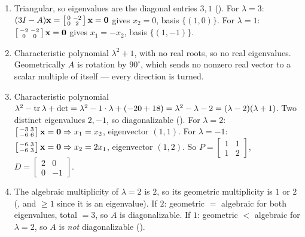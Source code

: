 \begin{enumerate}[label=\textbf{6.\arabic*},leftmargin=2.6em,itemsep=8pt]

\item Triangular, so eigenvalues are the diagonal entries $3,1$ (). For $\lambda=3$: $(3I-A)\mathbf{x}=\left[\begin{smallmatrix}0&-2\\0&2\end{smallmatrix}\right]\mathbf{x}=\mathbf{0}$ gives $x_2=0$, basis $\{(1,0)\}$. For $\lambda=1$: $\left[\begin{smallmatrix}-2&-2\\0&0\end{smallmatrix}\right]\mathbf{x}=\mathbf{0}$ gives $x_1=-x_2$, basis $\{(1,-1)\}$.

\item Characteristic polynomial $\lambda^2+1$, with no real roots, so no real eigenvalues. Geometrically $A$ is rotation by $90^\circ$, which sends no nonzero real vector to a scalar multiple of itself --- every direction is turned.

\item Characteristic polynomial $\lambda^2-\operatorname{tr}\lambda+\det=\lambda^2-1\cdot\lambda+(-20+18)=\lambda^2-\lambda-2=(\lambda-2)(\lambda+1)$. Two distinct eigenvalues $2,-1$, so diagonalizable (). For $\lambda=2$: $\left[\begin{smallmatrix}-3&3\\-6&6\end{smallmatrix}\right]\mathbf{x}=\mathbf{0}\Rightarrow x_1=x_2$, eigenvector $(1,1)$. For $\lambda=-1$: $\left[\begin{smallmatrix}-6&3\\-6&3\end{smallmatrix}\right]\mathbf{x}=\mathbf{0}\Rightarrow x_2=2x_1$, eigenvector $(1,2)$. So $P=\left[\begin{smallmatrix}1&1\\1&2\end{smallmatrix}\right]$, $D=\left[\begin{smallmatrix}2&0\\0&-1\end{smallmatrix}\right]$.

\item The algebraic multiplicity of $\lambda=2$ is $2$, so its geometric multiplicity is $1$ or $2$ (, and $\ge1$ since it is an eigenvalue). If $2$: geometric $=$ algebraic for both eigenvalues, total $=3$, so $A$ is diagonalizable. If $1$: geometric $<$ algebraic for $\lambda=2$, so $A$ is \emph{not} diagonalizable ().


\end{enumerate}
